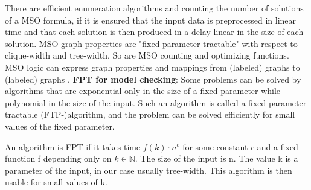 \documentclass[a4paper, 12pt, bibliography=totoc]{scrartcl}
\begin{document}
There are efficient enumeration algorithms \cite{MSOQueriesGuillaume} and counting the number of solutions \cite{ARNBORG1991308} of a MSO formula, if it is ensured that the input data is preprocessed in linear time and that each solution is then produced in a delay linear in the size of each solution.
MSO graph properties are "fixed-parameter-tractable" with respect to clique-width and tree-width. So are MSO counting and optimizing functions.
MSO logic can express graph properties and mappings from (labeled) graphs to (labeled) graphs \cite{CourcelleGROW}.
\textbf{FPT for model checking}:
Some problems can be solved by algorithms that are exponential only in the size of a fixed parameter while polynomial in the size of the input. Such an algorithm is called a fixed-parameter tractable (FTP-)algorithm, and the problem can be solved efficiently for small values of the fixed parameter.
\begin{thm}
	An algorithm is FPT if it takes time $f(k)\cdot n^{c}$ for some constant $c$ and a fixed function f depending only on $k \in \mathbb{N}$. The size of the input is n. 
	The value k is a parameter of the input, in our case usually tree-width. 
	This algorithm is then usable for small values of k.
\end{thm}


%
\end{document}
